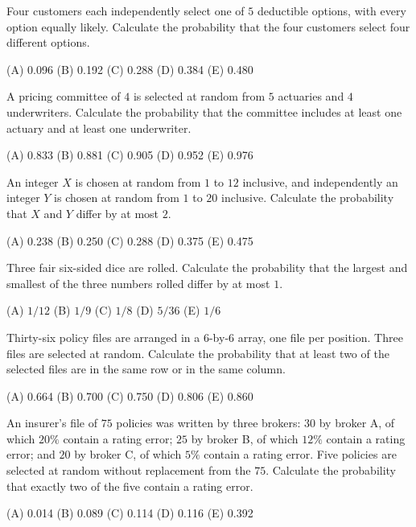 \begin{practice}
Four customers each independently select one of $5$ deductible options, with every option
equally likely. Calculate the probability that the four customers select four different
options.
\par\smallskip\noindent (A) 0.096 \quad (B) 0.192 \quad (C) 0.288 \quad (D) 0.384 \quad (E) 0.480
\end{practice}

\begin{practice}
A pricing committee of $4$ is selected at random from $5$ actuaries and $4$ underwriters.
Calculate the probability that the committee includes at least one actuary and at least one
underwriter.
\par\smallskip\noindent (A) 0.833 \quad (B) 0.881 \quad (C) 0.905 \quad (D) 0.952 \quad (E) 0.976
\end{practice}

\begin{practice}
An integer $X$ is chosen at random from $1$ to $12$ inclusive, and independently an integer
$Y$ is chosen at random from $1$ to $20$ inclusive. Calculate the probability that $X$ and
$Y$ differ by at most $2$.
\par\smallskip\noindent (A) 0.238 \quad (B) 0.250 \quad (C) 0.288 \quad (D) 0.375 \quad (E) 0.475
\end{practice}

\begin{practice}
Three fair six-sided dice are rolled. Calculate the probability that the largest and
smallest of the three numbers rolled differ by at most $1$.
\par\smallskip\noindent (A) $1/12$ \quad (B) $1/9$ \quad (C) $1/8$ \quad (D) $5/36$ \quad (E) $1/6$
\end{practice}

\begin{practice}
Thirty-six policy files are arranged in a $6$-by-$6$ array, one file per position. Three
files are selected at random. Calculate the probability that at least two of the selected
files are in the same row or in the same column.
\par\smallskip\noindent (A) 0.664 \quad (B) 0.700 \quad (C) 0.750 \quad (D) 0.806 \quad (E) 0.860
\end{practice}

\begin{practice}
An insurer's file of $75$ policies was written by three brokers: $30$ by broker A, of which
$20\%$ contain a rating error; $25$ by broker B, of which $12\%$ contain a rating error; and
$20$ by broker C, of which $5\%$ contain a rating error. Five policies are selected at random
without replacement from the $75$. Calculate the probability that exactly two of the five
contain a rating error.
\par\smallskip\noindent (A) 0.014 \quad (B) 0.089 \quad (C) 0.114 \quad (D) 0.116 \quad (E) 0.392
\end{practice}

